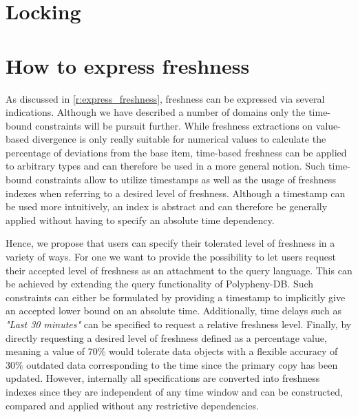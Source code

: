 \section{Locking}






\section{How to express freshness}
\label{express}

As discussed in \ref{r:express_freshness}, freshness can be expressed via several indications.
Although we have described a number of domains only the time-bound constraints will be pursuit further. 
While freshness extractions on value-based divergence is only really suitable for numerical values
to calculate the percentage of deviations from the base item, time-based freshness can be applied to arbitrary types and can therefore be used 
in a more general notion. 
Such time-bound constraints allow to utilize timestamps as well as the usage of freshness indexes when referring to a desired level of freshness. 
Although a timestamp can be used more intuitively, an index is abstract and can therefore be generally applied without having to specify an absolute time dependency.

Hence, we propose that users can specify their tolerated level of freshness in a variety of ways. For one we want to provide the possibility to let users 
request their accepted level of freshness as an attachment to the query language. This can be achieved by extending the query functionality of Polypheny-DB.
Such constraints can either be formulated by providing a timestamp to implicitly give an accepted lower bound on an absolute time.
Additionally, time delays such as \textit{"Last 30 minutes"} can be specified to request a relative freshness level.
Finally, by directly requesting a desired level of freshness defined as a percentage value, meaning a value of 70\% would tolerate data objects
with a flexible accuracy of 30\% outdated data corresponding to the time since the primary copy has been updated.
However, internally all specifications are converted into freshness indexes since they are independent of any time window and can be constructed, compared and applied 
without any restrictive dependencies.\\

